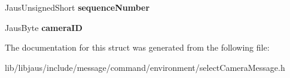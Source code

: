 \begin{DoxyCompactItemize}
\item 
\hypertarget{struct_select_camera_message_struct_a8ba702fb369da24094476a50bc81fca1}{\-Jaus\-Unsigned\-Short {\bfseries sequence\-Number}}\label{struct_select_camera_message_struct_a8ba702fb369da24094476a50bc81fca1}

\item 
\hypertarget{struct_select_camera_message_struct_aa2af212e7819f31816a13d254ff5cbc8}{\-Jaus\-Byte {\bfseries camera\-I\-D}}\label{struct_select_camera_message_struct_aa2af212e7819f31816a13d254ff5cbc8}

\end{DoxyCompactItemize}


\-The documentation for this struct was generated from the following file\-:\begin{DoxyCompactItemize}
\item 
lib/libjaus/include/message/command/environment/select\-Camera\-Message.\-h\end{DoxyCompactItemize}

